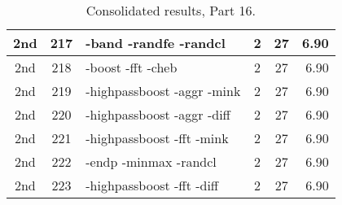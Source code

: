 \begin{table}
\begin{minipage}[b]{\textwidth}
\begin{tabular}{|c|c|l|c|c|r|}
2nd & 217 & -band -randfe -randcl  & 2 & 27 & 6.90\\ \hline
2nd & 218 & -boost -fft -cheb  & 2 & 27 & 6.90\\ \hline
2nd & 219 & -highpassboost -aggr -mink  & 2 & 27 & 6.90\\ \hline
2nd & 220 & -highpassboost -aggr -diff  & 2 & 27 & 6.90\\ \hline
2nd & 221 & -highpassboost -fft -mink  & 2 & 27 & 6.90\\ \hline
2nd & 222 & -endp -minmax -randcl  & 2 & 27 & 6.90\\ \hline
2nd & 223 & -highpassboost -fft -diff  & 2 & 27 & 6.90\\ \hline
\end{tabular}
\end{minipage}
\caption{Consolidated results, Part 16.}
\label{tab:results16}
\end{table}

